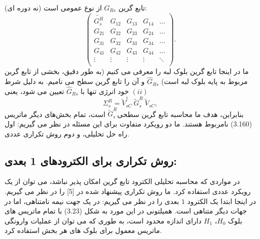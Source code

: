 تابع گرین $G_{Rs}$ از نوع عمومی است (نه دوره ای):
\begin{equation}
    \left( \begin{matrix}
           \widetilde{G_{s}^{R}} & {{G}_{12}} & {{G}_{13}} & {{G}_{14}} & \ldots   \\
           {{G}_{21}} & {{G}_{22}} & {{G}_{23}} & {{G}_{24}} & \ldots   \\
           {{G}_{31}} & {{G}_{32}} & {{G}_{33}} & {{G}_{34}} & \ldots   \\
           {{G}_{41}} & {{G}_{42}} & {{G}_{43}} & {{G}_{44}} & \ldots   \\
           \vdots  & \vdots  & \vdots  & \vdots  & \ddots   \\
        \end{matrix} \right).
\end{equation}
ما در اینجا تابع گرین بلوک لبه را معرفی می کنیم (به طور دقیق، بخشی از تابع گرین مربوط به پایه بلوک لبه است) $\hat{G}_{Rs}$ و آن را تابع گرین سطح می نامیم. به دلیل شرط $(ii)$ خود انرژی تنها با $\hat{G}_{Rs}$ تعیین می شود، یعنی
\begin{equation}
    \Sigma _{s}^{R}=\tilde{V}_{sC}^{\dagger }\ \tilde{G}_{s}^{R}\ {{\tilde{V}}_{sC}},
\end{equation}
بنابراین، هدف ما محاسبه تابع گرین سطحی$\tilde{G}^R_s$ است، تمام بخش‌های دیگر ماتریس (3.160) نامربوط هستند. ما دو رویکرد متفاوت برای این مسئله در نظر می گیریم: اول راه حل تحلیلی، و دوم روش تکراری عددی.

\subsection*{روش تکراری برای الکترودهای 1 بعدی:}
در مواردی که محاسبه تحلیلی الکترود تابع گرین امکان پذیر نباشد، می توان از یک رویکرد عددی استفاده کرد. ما روش تکراری پیشنهاد شده در [5] را در نظر می گیریم. در اینجا ابتدا یک الکترود $1$ بعدی را در نظر می گیریم: در یک جهت نیمه نامتناهی، اما در جهات دیگر متناهی است. همیلتونی در این مورد به شکل (3.23) با تمام ماتریس های بلوک $H_0$، $H_1$ دارای اندازه محدود است، به طوری که می توان از عملیات وارونگی ماتریس معمول برای بلوک های هر بخش استفاده کرد.

